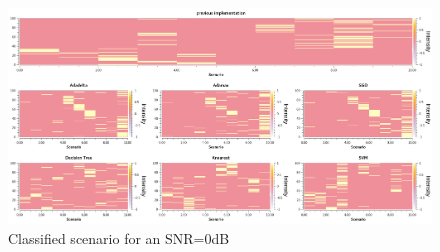 \begin{figure}[!htb]
    \centering
      \includegraphics[width=\textwidth]{figures/scn_snr_0}
      \caption{Classified scenario for an SNR=0dB}
      \label{fig:scn_snr_0}
\end{figure}

